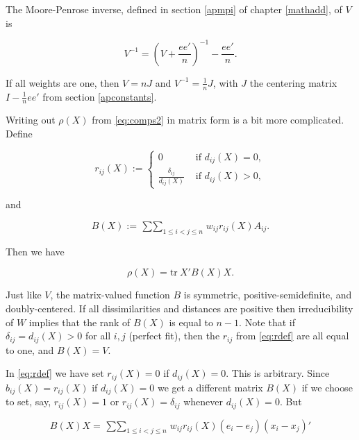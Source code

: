 \documentclass[
  12pt,
]{book}
\theoremstyle{definition}
\theoremstyle{definition}
\theoremstyle{definition}
\theoremstyle{definition}
\theoremstyle{remark}
\begin{document}
The Moore-Penrose inverse, defined in section \ref{apmpi} of chapter \ref{mathadd}, of \(V\) is

\begin{equation}
V^{-1}=(V+\frac{ee'}{n})^{-1}-\frac{ee'}{n}.
\label{eq:mpv}
\end{equation}

If all weights are one, then \(V=nJ\) and \(V^{-1}=\frac{1}{n}J\), with \(J\) the centering matrix \(I-\frac{1}{n}ee'\) from section \ref{apconstants}.

Writing out \(\rho(X)\) from \eqref{eq:comps2} in matrix form is a bit more complicated. Define

\begin{equation}
r_{ij}(X):=\begin{cases}0&\text{ if }d_{ij}(X)=0,\\
\frac{\delta_{ij}}{d_{ij}(X)}&\text{ if }d_{ij}(X)>0,
\end{cases}
\label{eq:rdef}
\end{equation}

and

\begin{equation}
B(X):=\mathop{\sum\sum}_{1\leq i<j\leq n}w_{ij}r_{ij}(X)A_{ij}.
\label{eq:bdef}
\end{equation}

Then we have

\begin{equation}
\rho(X)=\text{tr}\ X'B(X)X.
\label{eq:rhob}
\end{equation}

Just like \(V\), the matrix-valued function \(B\) is symmetric, positive-semidefinite, and doubly-centered. If all dissimilarities and distances are positive then irreducibility of \(W\) implies that the rank of \(B(X)\) is equal to \(n-1\). Note that if \(\delta_{ij}=d_{ij}(X)>0\) for all \(i,j\) (perfect fit), then the \(r_{ij}\) from \eqref{eq:rdef} are all equal to one, and \(B(X)=V\).

In \eqref{eq:rdef} we have set \(r_{ij}(X)=0\) if \(d_{ij}(X)=0\). This is arbitrary. Since \(b_{ij}(X)=r_{ij}(X)\) if \(d_{ij}(X)=0\) we get a different matrix \(B(X)\) if we choose to set, say, \(r_{ij}(X)=1\) or \(r_{ij}(X)=\delta_{ij}\) whenever \(d_{ij}(X)=0\). But

\begin{equation}
B(X)X=\mathop{\sum\sum}_{1 \leq i<j\leq n}w_{ij}r_{ij}(X)(e_i-e_j)(x_i-x_j)'
\label{eq:propbinvar}
\end{equation}
\end{document}
